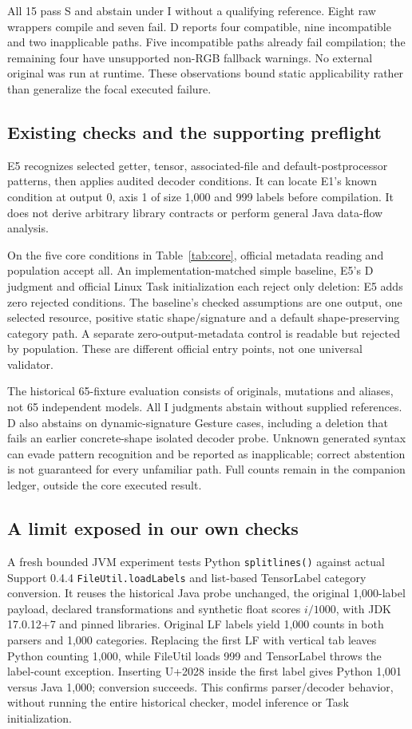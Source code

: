 \documentclass[10pt,conference]{IEEEtran}
\newcommand{\code}[1]{\texttt{#1}}
\begin{document}
All 15 pass S and abstain under I without a qualifying reference. Eight raw wrappers compile and seven fail. D reports four compatible, nine incompatible and two inapplicable paths. Five incompatible paths already fail compilation; the remaining four have unsupported non-RGB fallback warnings. No external original was run at runtime. These observations bound static applicability rather than generalize the focal executed failure.

\subsection{Existing checks and the supporting preflight}
E5 recognizes selected getter, tensor, associated-file and default-postprocessor patterns, then applies audited decoder conditions. It can locate E1's known condition at output 0, axis 1 of size 1,000 and 999 labels before compilation. It does not derive arbitrary library contracts or perform general Java data-flow analysis.

On the five core conditions in Table~\ref{tab:core}, official metadata reading and population accept all. An implementation-matched simple baseline, E5's D judgment and official Linux Task initialization each reject only deletion: E5 adds zero rejected conditions. The baseline's checked assumptions are one output, one selected resource, positive static shape/signature and a default shape-preserving category path. A separate zero-output-metadata control is readable but rejected by population. These are different official entry points, not one universal validator.

The historical 65-fixture evaluation consists of originals, mutations and aliases, not 65 independent models. All I judgments abstain without supplied references. D also abstains on dynamic-signature Gesture cases, including a deletion that fails an earlier concrete-shape isolated decoder probe. Unknown generated syntax can evade pattern recognition and be reported as inapplicable; correct abstention is not guaranteed for every unfamiliar path. Full counts remain in the companion ledger, outside the core executed result.

\subsection{A limit exposed in our own checks}
A fresh bounded JVM experiment tests Python \code{splitlines()} against actual Support 0.4.4 \code{FileUtil.loadLabels} and list-based TensorLabel category conversion. It reuses the historical Java probe unchanged, the original 1,000-label payload, declared transformations and synthetic float scores $i/1000$, with JDK 17.0.12+7 and pinned libraries. Original LF labels yield 1,000 counts in both parsers and 1,000 categories. Replacing the first LF with vertical tab leaves Python counting 1,000, while FileUtil loads 999 and TensorLabel throws the label-count exception. Inserting U+2028 inside the first label gives Python 1,001 versus Java 1,000; conversion succeeds. This confirms parser/decoder behavior, without running the entire historical checker, model inference or Task initialization.
\end{document}
